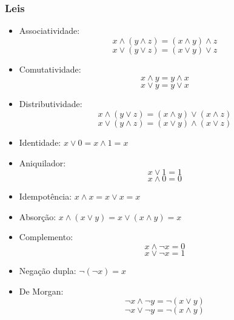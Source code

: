 \subsubsection{Leis}
\begin{multicols}{2}
    \begin{itemize}
        \item Associatividade:
        $$x\land(y \land z) = (x\land y) \land z $$$$ x\lor(y \lor z) = (x\lor y) \lor z$$
        \item Comutatividade:
        $$x\land y = y \land x $$ $$x\lor y = y \lor x$$
        \item Distributividade:
        $$x\land(y \lor z) = (x\land y) \lor (x \land z) $$$$ x\lor(y \land z) = (x\lor y) \land (x \lor z)$$
        \item Identidade: $x\lor 0 = x\land1=x$
        \item Aniquilador: $$x\lor 1 = 1 $$$$ x\land 0 =0$$
        \item Idempotência: $x\land x = x\lor x = x$
        \item Absorção: $x\land(x\lor y) = x \lor(x \land y) = x$    
        \item Complemento: $$x\land \neg x = 0 $$$$ x \lor \neg x = 1$$
        \item Negação dupla: $\neg(\neg x)=x$
        \item De Morgan: $$\neg x \land \neg y = \neg(x \lor y) $$$$ \neg x \lor \neg y = \neg(x \land y)$$
    \end{itemize}
    
\end{multicols}